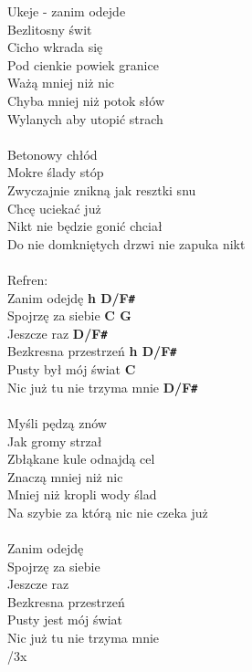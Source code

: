 Ukeje - zanim odejde\\
Bezlitosny świt\\
Cicho wkrada się\\
Pod cienkie powiek granice\\
Ważą mniej niż nic\\
Chyba mniej niż potok słów\\
Wylanych aby utopić strach\\
 \\
Betonowy chłód\\
Mokre ślady stóp\\
Zwyczajnie znikną jak resztki snu\\
Chcę uciekać już\\
Nikt nie będzie gonić chciał\\
Do nie domkniętych drzwi nie zapuka nikt\\
 \\
Refren:\\
Zanim odejdę                        \textbf{h D/F\texttt{\#}}\\
Spojrzę za siebie                   \textbf{C G}\\
Jeszcze raz                         \textbf{D/F\texttt{\#}}\\
Bezkresna przestrzeń                \textbf{h D/F\texttt{\#}}\\
Pusty był mój świat                 \textbf{C}\\
Nic już tu nie trzyma mnie          \textbf{D/F\texttt{\#}}\\
 \\
Myśli pędzą znów\\
Jak gromy strzał\\
Zbłąkane kule odnajdą cel\\
Znaczą mniej niż nic\\
Mniej niż kropli wody ślad\\
Na szybie za którą nic nie czeka już\\
 \\
Zanim odejdę\\
Spojrzę za siebie\\
Jeszcze raz\\
Bezkresna przestrzeń\\
Pusty jest mój świat\\
Nic już tu nie trzyma mnie\\
/3x\\
\newpage


